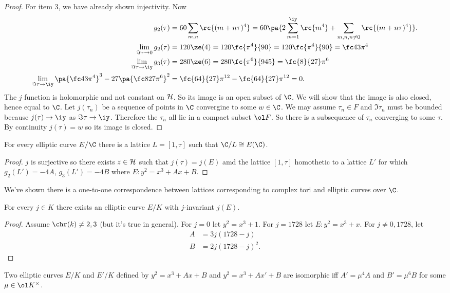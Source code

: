 \begin{proof}
For item 3, we have already shown injectivity. Now
\begin{align*}
g_2(\tau)&=60\sum_{m,n} \rc{(m+n\tau)^4}
=60\pa{2\sum_{m=1}^{\iy} \rc{m^4}+\sum_{m,n,n\ne 0}\rc{(m+n\tau)^4}}.\\
\lim_{\Im \tau \to 0} g_2(\tau)&=120\ze(4) = 120\fc{\pi^4}{90} =120\fc{\pi^4}{90}=\fc 43\pi^4\\
\lim_{\Im \tau\to \iy} g_3(\tau)&=280\ze(6) =280 \fc{\pi^6}{945}=\fc{8}{27}\pi^6\\
\lim_{\Im \tau\to \iy} \pa{\fc 43\pi^4}^3-27\pa{\fc 8{27}\pi^6}^2&=\fc{64}{27}\pi^{12}-\fc{64}{27}\pi^{12}=0.
\end{align*}
The $j$ function is holomorphic and not constant on $\cal H$. So its image is an open subset of $\C$. We will show that the image is also closed, hence equal to $\C$. Let $j(\tau_n)$ be a sequence of points in $\C$ convergine to some $w\in \C$. We may assume $\tau_n\in F$ and $\Im \tau_n$ must be bounded because $j(\tau)\to \iy$ as $\Im\tau\to \iy$. Therefore the $\tau_n$ all lie in a compact subset $\ol F$. So there is a subsequence of $\tau_n$ converging to some $\tau$. By continuity $j(\tau)=w$ so its image is closed.
\end{proof}
\begin{cor}
For every elliptic curve $E/\C$ there is a lattice $L=[1,\tau]$ such that $\C/L\cong E(\C)$. 
\end{cor}
\begin{proof}
$j$ is surjective so there exists $z\in \cal H$ such that $j(\tau)=j(E)$ amd the lattice $[1,\tau]$ homothetic to a lattice $L'$ for which $g_2(L')=-4A$, $g_3(L')=-4B$ where $E:y^2=x^3+Ax+B$.
\end{proof}
We've shown there is a one-to-one correspondence between lattices corresponding to complex tori and elliptic curves over $\C$.
\begin{thm}
For every $j\in K$ there exists an elliptic curve $E/K$ with $j$-invariant $j(E)$.
\end{thm}
\begin{proof}
Assume $\chr(k)\ne 2,3$ (but it's true in general). For $j=0$ let $y^2=x^3+1$. For $j=1728$ let $E:y^2=x^3+x$. For $j\ne 0,1728$, let
\begin{align*}
A&=3j(1728-j)\\
B&=2j(1728-j)^2.
\end{align*}
\end{proof}
\begin{thm}
Two elliptic curves $E/K$ and $E'/K$ defined by $y^2=x^3+Ax+B$ and $y^2=x^3+Ax'+B$ are isomorphic iff $A'=\mu^4A$ and $B'=\mu^6B$ for some $\mu\in \ol K^{\times}$.
\end{thm}
